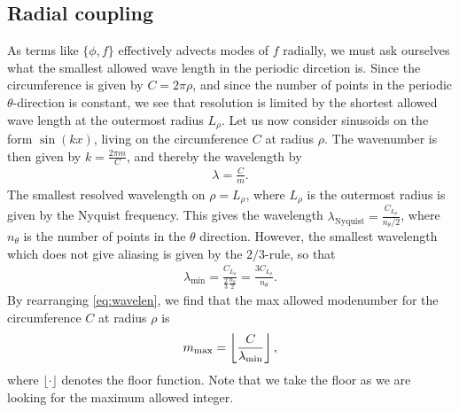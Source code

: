 \subsection{Radial coupling}
%
As terms like $\{\phi, f\}$ effectively advects modes of $f$ radially, we must ask ourselves what the smallest allowed wave length in the periodic dircetion is.
Since the circumference is given by $C=2\pi\rho$, and since the number of points in the periodic $\theta$-direction is constant, we see that resolution is limited by the shortest allowed wave length at the outermost radius $L_\rho$.
Let us now consider sinusoids on the form $\sin(kx)$, living on the circumference $C$ at radius $\rho$.
The wavenumber is then given by $k=\frac{2\pi m}{C}$, and thereby the wavelength by
%
\begin{align}
    \lambda = \frac{C}{m}.
    \label{eq:wavelen}
\end{align}
%
The smallest resolved wavelength on $\rho=L_\rho$, where $L_\rho$ is the outermost radius is given by the Nyquist frequency.
This gives the wavelength $\lambda_{\text{Nyquist}} = \frac{C_{L_\rho}}{n_\theta/2}$, where $n_\theta$ is the number of points in the $\theta$ direction.
However, the smallest wavelength which does not give aliasing is given by the $2/3$-rule, so that
%
\begin{align}
    \lambda_\min = \frac{C_{L_\rho}}{\frac{2}{3}\frac{n_\theta}{2}} = \frac{3C_{L_\rho}}{n_\theta}.
\end{align}
%
By rearranging \cref{eq:wavelen}, we find that the max allowed modenumber for the circumference $C$ at radius $\rho$ is
%
\begin{align}
    m_{\text{max}} = \left\lfloor \frac{C}{\lambda_{\text{min}}}\right\rfloor,
\end{align}
%
where $\lfloor \cdot \rfloor$ denotes the floor function.
Note that we take the floor as we are looking for the maximum allowed integer.
